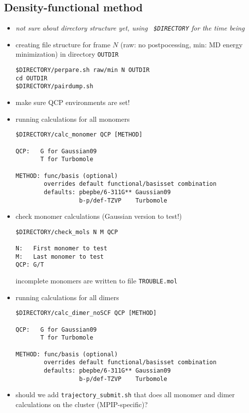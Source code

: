 \subsection{Density-functional method}

\begin{itemize}
\item {\it not sure about directory structure yet, using {\tt
      \$DIRECTORY} for the time being}
\item creating file structure for frame $N$ (raw: no postpocessing,
  min: MD energy minimization) in directory {\tt OUTDIR}
\begin{verbatim}
$DIRECTORY/perpare.sh raw/min N OUTDIR
cd OUTDIR
$DIRECTORY/pairdump.sh
\end{verbatim}
\item make sure QCP environments are set!
\item running calculations for all monomers
 \begin{verbatim}
$DIRECTORY/calc_monomer QCP [METHOD]

QCP:   G for Gaussian09
       T for Turbomole

METHOD: func/basis (optional)
        overrides default functional/basisset combination
        defaults: pbepbe/6-311G** Gaussian09
                  b-p/def-TZVP    Turbomole
\end{verbatim}
\item check monomer calculations (Gaussian version to test!) 
\begin{verbatim}
$DIRECTORY/check_mols N M QCP

N:   First monomer to test
M:   Last monomer to test
QCP: G/T 
\end{verbatim}
incomplete monomers are written to file {\tt TROUBLE.mol}
\item running calculations for all dimers
 \begin{verbatim}
$DIRECTORY/calc_dimer_noSCF QCP [METHOD]

QCP:   G for Gaussian09
       T for Turbomole

METHOD: func/basis (optional)
        overrides default functional/basisset combination
        defaults: pbepbe/6-311G** Gaussian09
                  b-p/def-TZVP    Turbomole
\end{verbatim}
\item should we add {\tt trajectory\_submit.sh} that does all monomer
  and dimer calculations on the cluster (MPIP-specific)?
\end{itemize}
